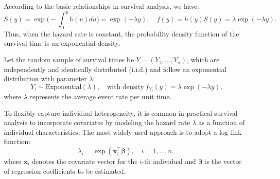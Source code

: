 According to the basic relationships in survival analysis, we have:
$$
S(y) = \exp\Big( -\int_0^y h(u) du \Big) = \exp(-\lambda y), 
\quad 
f(y) = h(y) S(y) = \lambda \exp(-\lambda y).
$$
Thus, when the hazard rate is constant, the probability density function of the survival time is an exponential density.

Let the random sample of survival times be $Y = (Y_1, \ldots, Y_n)$, which are independently and identically distributed (i.i.d.) and follow an exponential distribution with parameter $\lambda$:
$$
Y_i \sim \text{Exponential}(\lambda), 
\quad 
\text{with density} ~ f_{Y_i}(y) = \lambda \exp(-\lambda y).
$$
where $\lambda$ represents the average event rate per unit time.

To flexibly capture individual heterogeneity, it is common in practical survival analysis to incorporate covariates by modeling the hazard rate $\lambda$ as a function of individual characteristics. The most widely used approach is to adopt a log-link function:
$$
\lambda_i = \exp(\mathbf{x}_i^\top \boldsymbol{\beta}),
\quad i = 1, \ldots, n,
$$
where $\mathbf{x}_i$ denotes the covariate vector for the $i$-th individual and $\boldsymbol{\beta}$ is the vector of regression coefficients to be estimated.

